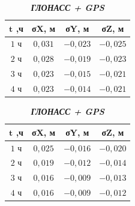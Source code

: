 \begin{table} [htbp]
	\centering\small
	\label{tab:tab18}{%
		\hfill
		\begin{subtable}{.33\linewidth}	
			\centering
			\caption*{\textbf{\textit{GPS}}}
			\begin{tabular}{|c|c|c|c|}
				\hline
				$\mathbf{t}$ \textbf{,ч}   & \textbf{σX, м}    & \textbf{σY, м}  & \textbf{σZ, м} \\ \hline
				$1$ ч                      & $ 0,031$          & $-0,023$        & $-0,025$        \\ \hline
				$2$ ч                      & $ 0,028$          & $-0,019$        & $-0,023$        \\ \hline
				$3$ ч                      & $ 0,023$          & $-0,015$        & $-0,021$        \\ \hline
				$4$ ч	                   & $ 0,023$          & $-0,014$        & $-0,021$        \\ \hline
			\end{tabular}
		\end{subtable}%
		\qquad
		\begin{subtable}{.33\linewidth}	
			\centering
			\caption*{\textbf{\textit{ГЛОНАСС + GPS}}}
			\begin{tabular}{|c|c|c|c|}
				\hline
				$\mathbf{t}$ \textbf{,ч}   & \textbf{σX, м}    & \textbf{σY, м}  & \textbf{σZ, м}  \\ \hline
				$1$ ч                      & $ 0,025$          & $-0,016$        & $-0,020$        \\ \hline
				$2$ ч                      & $ 0,019$          & $-0,012$        & $-0,014$        \\ \hline
				$3$ ч                      & $ 0,016$          & $-0,009$        & $-0,013$        \\ \hline
				$4$ ч	                   & $ 0,016$          & $-0,009$        & $-0,012$        \\ \hline
			\end{tabular}
		\end{subtable}\hfill%
	}
\end{table}


